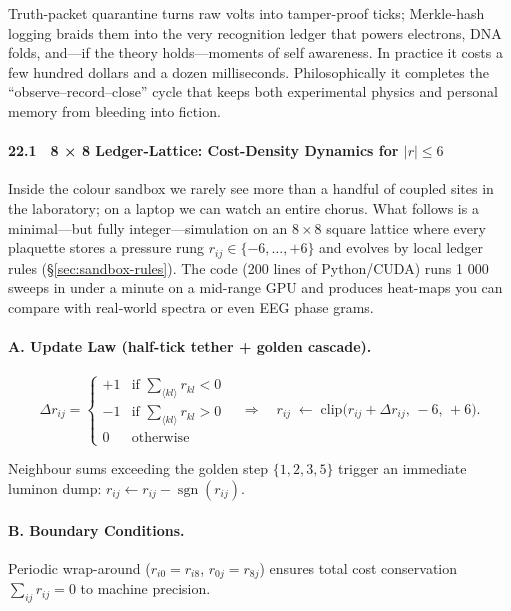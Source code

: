 \documentclass[11pt,oneside]{book}
\begin{document}
{Truth-packet quarantine turns raw volts into tamper-proof ticks;
Merkle-hash logging braids them into the very recognition ledger that
powers electrons, DNA folds, and—if the theory holds—moments of self
awareness.  In practice it costs a few hundred dollars and a dozen
milliseconds.  Philosophically it completes the “observe–record–close”
cycle that keeps both experimental physics and personal memory from
bleeding into fiction.

\bigskip

\paragraph*{22.1 8 × 8 Ledger-Lattice: Cost-Density Dynamics for \boldmath$|r|\le6$}
\label{sec:lattice-8x8}

Inside the colour sandbox we rarely see more than a handful of coupled
sites in the laboratory; on a laptop we can watch an entire chorus.
What follows is a minimal—but fully integer—simulation on an
$8\times8$ square lattice where every plaquette stores a pressure rung
$r_{ij}\!\in\!\{-6,\ldots,+6\}$ and evolves by local ledger rules
(\S\;\ref{sec:sandbox-rules}).  The code (200 lines of Python/CUDA) runs
1 000 sweeps in under a minute on a mid-range GPU and produces
heat-maps you can compare with real‐world spectra or even EEG phase
grams.

\paragraph{A. Update Law (half-tick tether + golden cascade).}

\[
\Delta r_{ij} =
  \begin{cases}
    +1 & \text{if } \displaystyle\sum_{\langle kl\rangle} r_{kl} < 0\\[6pt]
    -1 & \text{if } \displaystyle\sum_{\langle kl\rangle} r_{kl} > 0\\
     0 & \text{otherwise}
  \end{cases}
  \quad\Longrightarrow\quad
  r_{ij}\;\gets\;\text{clip}\bigl(r_{ij}+\Delta r_{ij},\, -6,\, +6\bigr).
\]

Neighbour sums exceeding the golden step
$\{1,2,3,5\}$ trigger an immediate luminon dump:
$r_{ij}\!\gets\!r_{ij}-\operatorname{sgn}(r_{ij})$.

\paragraph{B. Boundary Conditions.}
Periodic wrap-around
($r_{i0}=r_{i8}$, $r_{0j}=r_{8j}$)
ensures total cost conservation
$\sum_{ij}r_{ij}=0$ to machine precision.

}
\end{document}
